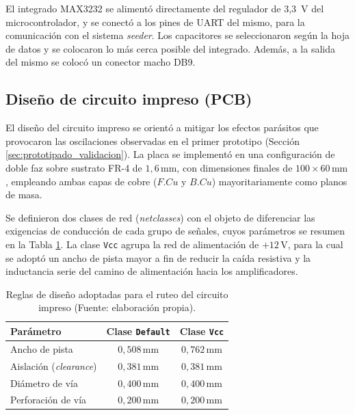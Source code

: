 El integrado MAX3232 se alimentó directamente del regulador de 3,3~V del microcontrolador, y se conectó a los pines de UART del mismo, para la comunicación con el sistema \emph{seeder}. Los capacitores se seleccionaron según la hoja de datos \cite{ti_max3232} y se colocaron lo más cerca posible del integrado. Además, a la salida del mismo se colocó un conector macho DB9.

\subsection{Diseño de circuito impreso (PCB)}
\label{sec:mitigacion_parasitos}

El diseño del circuito impreso se orientó a mitigar los efectos parásitos que provocaron las oscilaciones observadas en el primer prototipo (Sección \ref{sec:prototipado_validacion}). La placa se implementó en una configuración de doble faz sobre sustrato FR-4 de $1{,}6\,\text{mm}$, con dimensiones finales de $100 \times 60\,\text{mm}$, empleando ambas capas de cobre ($F.Cu$ y $B.Cu$) mayoritariamente como planos de masa.

Se definieron dos clases de red (\emph{netclasses}) con el objeto de diferenciar las exigencias de conducción de cada grupo de señales, cuyos parámetros se resumen en la Tabla \ref{tab:reglas_diseno}. La clase \texttt{Vcc} agrupa la red de alimentación de $+12\,\text{V}$, para la cual se adoptó un ancho de pista mayor a fin de reducir la caída resistiva y la inductancia serie del camino de alimentación hacia los amplificadores.

\begin{table}[htpb]
  \centering
  \begin{tabular}{lcc}
    \toprule
    \textbf{Parámetro} & \textbf{Clase \texttt{Default}} & \textbf{Clase \texttt{Vcc}} \\
    \midrule
    Ancho de pista            & $0{,}508\,\text{mm}$ & $0{,}762\,\text{mm}$ \\
    Aislación (\emph{clearance}) & $0{,}381\,\text{mm}$ & $0{,}381\,\text{mm}$ \\
    Diámetro de vía           & $0{,}400\,\text{mm}$ & $0{,}400\,\text{mm}$ \\
    Perforación de vía        & $0{,}200\,\text{mm}$ & $0{,}200\,\text{mm}$ \\
    \bottomrule
  \end{tabular}
  \caption{Reglas de diseño adoptadas para el ruteo del circuito impreso (Fuente: elaboración propia).}
  \label{tab:reglas_diseno}
\end{table}

